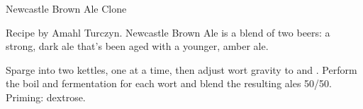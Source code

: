 \begin{recipe}{Newcastle Brown Ale Clone} %

\begin{aboutblock}
Recipe by Amahl Turczyn. Newcastle Brown Ale is a blend of two beers: a strong,
dark ale that's been aged with a younger, amber ale.
\end{aboutblock}


\begin{methodandtiming}

\begin{mashsteps}
\end{mashsteps}

\begin{fermentationsteps}
\end{fermentationsteps}

\begin{directions}
Sparge into two kettles, one at a time, then adjust wort gravity to 
and . Perform the boil and fermentation for each wort and blend the
resulting ales 50/50. Priming:  dextrose.
\end{directions}

\end{methodandtiming}

\recipebreak

\begin{ingredientsblock}

\begin{malts}
\end{malts}

\begin{hops}
\end{hops}


\end{ingredientsblock}

\end{recipe}

